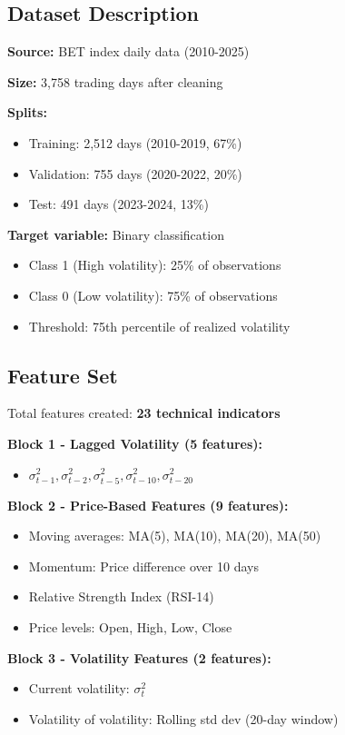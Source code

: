 \documentclass[12pt,a4paper]{article}
\begin{document}
\subsection{Dataset Description}

\textbf{Source:} BET index daily data (2010-2025)

\textbf{Size:} 3,758 trading days after cleaning

\textbf{Splits:}
\begin{itemize}
    \item Training: 2,512 days (2010-2019, 67\%)
    \item Validation: 755 days (2020-2022, 20\%)
    \item Test: 491 days (2023-2024, 13\%)
\end{itemize}

\textbf{Target variable:} Binary classification
\begin{itemize}
    \item Class 1 (High volatility): 25\% of observations
    \item Class 0 (Low volatility): 75\% of observations
    \item Threshold: 75th percentile of realized volatility
\end{itemize}

\subsection{Feature Set}

Total features created: \textbf{23 technical indicators}

\textbf{Block 1 - Lagged Volatility (5 features):}
\begin{itemize}
    \item $\sigma_{t-1}^2, \sigma_{t-2}^2, \sigma_{t-5}^2, \sigma_{t-10}^2, \sigma_{t-20}^2$
\end{itemize}

\textbf{Block 2 - Price-Based Features (9 features):}
\begin{itemize}
    \item Moving averages: MA(5), MA(10), MA(20), MA(50)
    \item Momentum: Price difference over 10 days
    \item Relative Strength Index (RSI-14)
    \item Price levels: Open, High, Low, Close
\end{itemize}

\textbf{Block 3 - Volatility Features (2 features):}
\begin{itemize}
    \item Current volatility: $\sigma_t^2$
    \item Volatility of volatility: Rolling std dev (20-day window)
\end{itemize}
\end{document}
